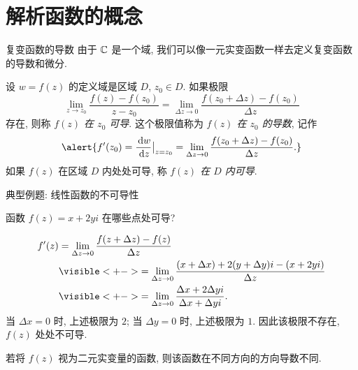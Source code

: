 \section{解析函数的概念}


\begin{frame}{复变函数的导数}
\onslide<+->
由于 ${\mathbb{C}}$ 是一个域, 我们可以像一元实变函数一样去定义复变函数的导数和微分.
\begin{definition}
设 $w=f(z)$ 的定义域是区域 $D$, $z_0\in D$.
\onslide<+->
如果极限
\[\lim_{z\to z_0}\frac{f(z)-f(z_0)}{z-z_0}
=\lim_{\Delta z\to 0}\frac{f(z_0+\Delta z)-f(z_0)}{\Delta z}\]
存在, 则称 \emph{$f(z)$ 在 $z_0$ 可导}.
\onslide<+->
这个极限值称为 \emph{$f(z)$ 在 $z_0$ 的导数}, 记作
\[\alert{f'(z_0)=\frac{\diff w}{\diff z}\big|_{z=z_0}
=\lim_{\Delta z\to 0}\frac{f(z_0+\Delta z)-f(z_0)}{\Delta z}.}\]
\onslide<+->
如果 $f(z)$ 在区域 $D$ 内处处可导, 称 \emph{$f(z)$ 在 $D$ 内可导}.
\end{definition}
\end{frame}


\begin{frame}{典型例题: 线性函数的不可导性}
\beqskip{4pt}
\begin{example}
函数 $f(z)=x+2yi$ 在哪些点处可导?
\end{example}
\begin{solution}
\vspace{-0.5\baselineskip}
\begin{align*}
f'(z)&=\lim_{\Delta z\to 0}\frac{f(z+\Delta z)-f(z)}{\Delta z}\\
&\visible<+->{=\lim_{\Delta z\to 0}\frac{(x+\Delta x)+2(y+\Delta y)i-(x+2yi)}{\Delta z}}\\
&\visible<+->{=\lim_{\Delta z\to 0}\frac{\Delta x+2\Delta y i}{\Delta x+\Delta yi}.}
\end{align*}
\onslide<+->
当 $\Delta x=0$ 时, 上述极限为 $2$;
\onslide<+->
当 $\Delta y=0$ 时, 上述极限为 $1$.
\onslide<+->
因此该极限不存在, $f(z)$ 处处不可导.
\end{solution}
\onslide<+->
若将 $f(z)$ 视为二元实变量的函数, 则该函数在不同方向的方向导数不同.
\endgroup
\end{frame}



